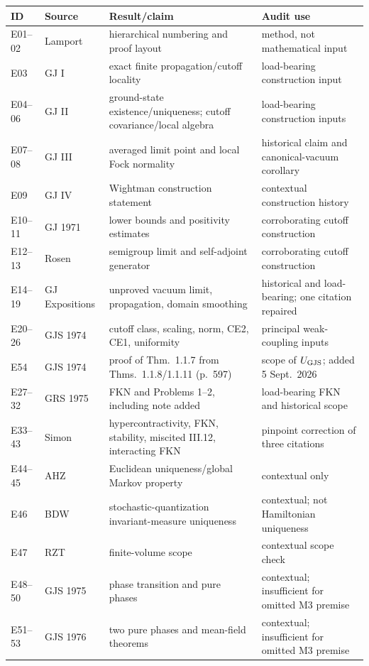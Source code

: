 \documentclass[10pt,a4paper]{article}
\begin{document}
\begin{longtable}{P{1.0cm}P{3.2cm}P{5.1cm}P{4.7cm}}
\toprule
ID & Source & Result/claim & Audit use\\
\midrule
\endhead
E01--02 & Lamport & hierarchical numbering and proof layout & method, not mathematical input\\
E03 & GJ I & exact finite propagation/cutoff locality & load-bearing construction input\\
E04--06 & GJ II & ground-state existence/uniqueness; cutoff covariance/local algebra & load-bearing construction inputs\\
E07--08 & GJ III & averaged limit point and local Fock normality & historical claim and canonical-vacuum corollary\\
E09 & GJ IV & Wightman construction statement & contextual construction history\\
E10--11 & GJ 1971 & lower bounds and positivity estimates & corroborating cutoff construction\\
E12--13 & Rosen & semigroup limit and self-adjoint generator & corroborating cutoff construction\\
E14--19 & GJ Expositions & unproved vacuum limit, propagation, domain smoothing & historical and load-bearing; one citation repaired\\
E20--26 & GJS 1974 & cutoff class, scaling, norm, CE2, CE1, uniformity & principal weak-coupling inputs\\
E54 & GJS 1974 & proof of Thm.~1.1.7 from Thms.~1.1.8/1.1.11 (p.~597) & scope of $U_{\rm GJS}$; added 5 Sept.\ 2026\\
E27--32 & GRS 1975 & FKN and Problems 1--2, including note added & load-bearing FKN and historical scope\\
E33--43 & Simon & hypercontractivity, FKN, stability, miscited III.12, interacting FKN & pinpoint correction of three citations\\
E44--45 & AHZ & Euclidean uniqueness/global Markov property & contextual only\\
E46 & BDW & stochastic-quantization invariant-measure uniqueness & contextual; not Hamiltonian uniqueness\\
E47 & RZT & finite-volume scope & contextual scope check\\
E48--50 & GJS 1975 & phase transition and pure phases & contextual; insufficient for omitted M3 premise\\
E51--53 & GJS 1976 & two pure phases and mean-field theorems & contextual; insufficient for omitted M3 premise\\
\bottomrule
\end{longtable}
\end{document}
